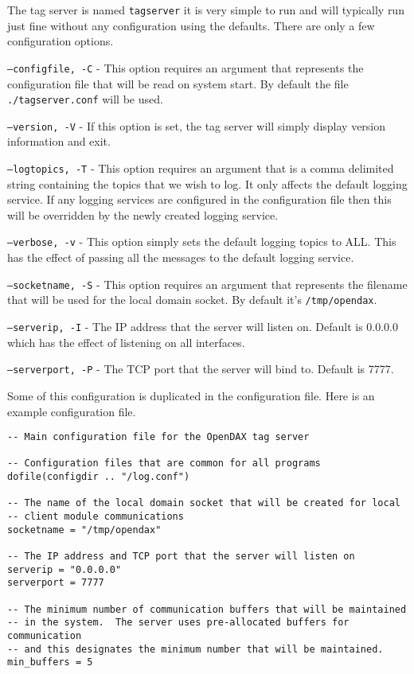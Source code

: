 The tag server is named \texttt{tagserver} it is very simple to run and will typically run just fine without any configuration using the defaults.  There are only a few configuration options.

\begin{list}{}{Command Line Options}
	\item[\texttt{--configfile, -C}] - This option requires an argument that represents the configuration file that will be read on system start.  By default the file \texttt{./tagserver.conf} will be used.
	\item[\texttt{--version, -V}] - If this option is set, the tag server will simply display version information and exit.
	\item[\texttt{--logtopics, -T}] - This option requires an argument that is a comma delimited string containing the topics that we wish to log.  It only affects the default logging service.  If any logging services are configured in the configuration file then this will be overridden by the newly created logging service.
	\item[\texttt{--verbose, -v}] - This option simply sets the default logging topics to ALL.  This has the effect of passing all the messages to the default logging service.
	\item[\texttt{--socketname, -S}] - This option requires an argument that represents the filename that will be used for the local domain socket.  By default it's \texttt{/tmp/opendax}.
	\item[\texttt{--serverip, -I}] - The IP address that the server will listen on.  Default is 0.0.0.0 which has the effect of listening on all interfaces.
	\item[\texttt{--serverport, -P}] - The TCP port that the server will bind to.  Default is 7777.
\end{list}

Some of this configuration is duplicated in the configuration file.  Here is an example configuration file.


\begin{verbatim}
-- Main configuration file for the OpenDAX tag server

-- Configuration files that are common for all programs
dofile(configdir .. "/log.conf")

-- The name of the local domain socket that will be created for local 
-- client module communications
socketname = "/tmp/opendax"

-- The IP address and TCP port that the server will listen on
serverip = "0.0.0.0"
serverport = 7777

-- The minimum number of communication buffers that will be maintained
-- in the system.  The server uses pre-allocated buffers for communication
-- and this designates the minimum number that will be maintained.
min_buffers = 5

\end{verbatim}

